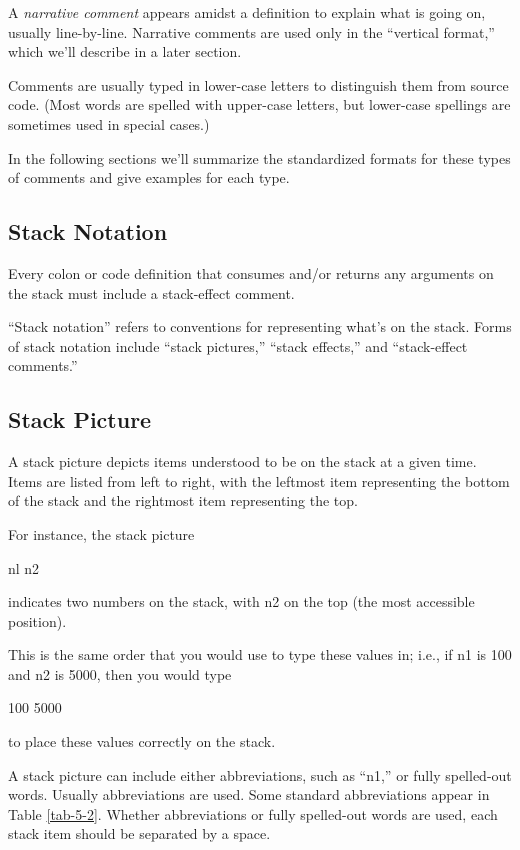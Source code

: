 A \emph{narrative comment} appears amidst a definition to explain what is
going on, usually line-by-line.  Narrative comments are used only in the
``vertical format,'' which we'll describe in a later section.

Comments are usually typed in lower-case letters to distinguish
them from source code.  (Most \Forth{} words are spelled with upper-case
letters, but lower-case spellings are sometimes used in special cases.)

In the following sections we'll summarize the standardized formats
for these types of comments and give examples for each type.

\subsection{Stack Notation}
\begin{tip}
Every colon or code definition that consumes and/or returns any arguments
on the stack must include a stack-effect comment.
\end{tip}


``Stack notation'' refers to conventions for representing what's on the
stack.  Forms of stack notation include ``stack pictures,'' ``stack effects,''
and ``stack-effect comments.''

\subsection{Stack Picture}

A stack picture depicts items understood to be on the stack at a given
time.  Items are listed from left to right, with the leftmost item representing
the bottom of the stack and the rightmost item representing the top.

For instance, the stack picture
\begin{Code}
nl n2
\end{Code}
indicates two numbers on the stack, with n2 on the top (the most accessible
position).

This is the same order that you would use to type these values in;
i.e., if n1 is 100 and n2 is 5000, then you would type
\begin{Code}
100 5000
\end{Code}
to place these values correctly on the stack.

A stack picture can include either abbreviations, such as ``n1,'' or
fully spelled-out words.  Usually abbreviations are used.  Some standard
abbreviations appear in Table \ref{tab-5-2}.  Whether abbreviations or fully
spelled-out words are used, each stack item should be separated by a
space.

